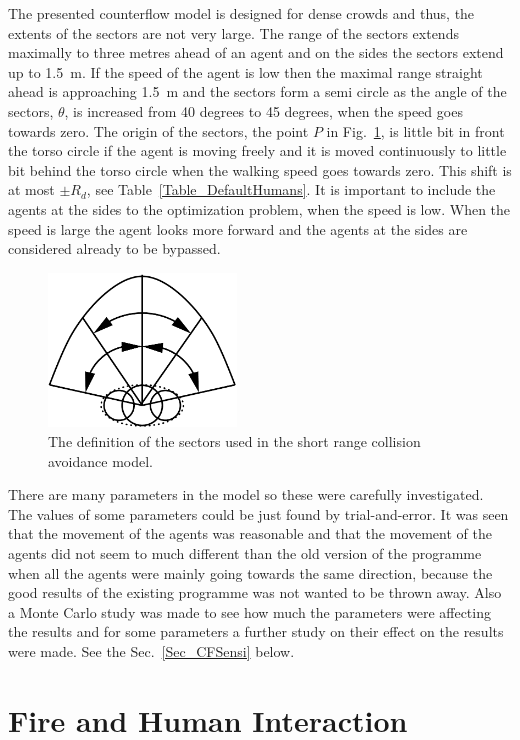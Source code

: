 \documentclass[12pt,a4paper,final,twoside]{stylevk}
\begin{document}
The presented counterflow model is designed for dense crowds and thus,
the extents of the sectors are not very large.  The range of the
sectors extends maximally to three metres ahead of an agent and on the
sides the sectors extend up to 1.5~m.  If the speed of the agent is
low then the maximal range straight ahead is approaching 1.5~m and the
sectors form a semi circle as the angle of the sectors, $\theta$, is
increased from 40 degrees to 45 degrees, when the speed goes towards
zero.  The origin of the sectors, the point $P$ in
Fig.~\ref{Fig_CFsectors}, is little bit in front the torso circle if
the agent is moving freely and it is moved continuously to little bit
behind the torso circle when the walking speed goes towards zero.
This shift is at most $\pm R_d$, see Table~\ref{Table_DefaultHumans}.
It is important to include the agents at the sides to the optimization
problem, when the speed is low.  When the speed is large the agent
looks more forward and the agents at the sides are considered already
to be bypassed.


%
\begin{figure}[!tb]
  \centerline{ \includegraphics[clip=true, width=50mm]{FIGURES/CF_Sectors}} 
  \caption{The definition of the sectors used in the short range
    collision avoidance model.}\label{Fig_CFsectors}
\end{figure}


There are many parameters in the model so these were carefully
investigated.  The values of some parameters could be just found by
trial-and-error.  It was seen that the movement of the agents was
reasonable and that the movement of the agents did not seem to much
different than the old version of the programme when all the agents
were mainly going towards the same direction, because the good results
of the existing programme was not wanted to be thrown away.  Also a
Monte Carlo study was made to see how much the parameters were
affecting the results and for some parameters a further study on their
effect on the results were made.  See the Sec.~\ref{Sec_CFSensi}
below.


\section{Fire and Human Interaction}\label{Sec_FireHumanInt}
\end{document}
